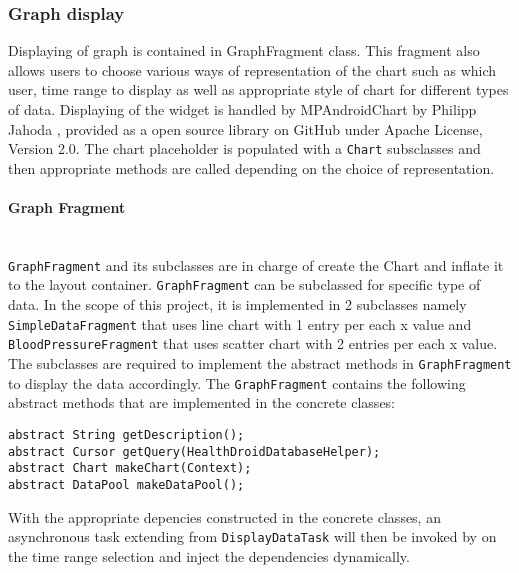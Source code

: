 \subsubsection{Graph display}
Displaying of graph is contained in GraphFragment class. This fragment also allows users to choose various ways of
representation of the chart such as which user, time range to display as well as appropriate style of chart for
different types of data. Displaying of the widget is handled by MPAndroidChart by Philipp Jahoda \cite{MPAndroidChart},
provided as a open source library on GitHub under Apache License, Version 2.0. The chart placeholder is populated with a
\texttt{Chart} subsclasses and then appropriate methods are called depending on the choice of representation.

\paragraph{Graph Fragment}\mbox{} \\
\texttt{GraphFragment} and its subclasses are in charge of create the Chart and inflate it to the layout container.
\texttt{GraphFragment} can be subclassed for specific type of data. In the scope of this project, it is implemented in 2
subclasses namely \texttt{SimpleDataFragment} that uses line chart with 1 entry per each x value and
\texttt{BloodPressureFragment} that uses scatter chart with 2 entries per each x value. The subclasses are required to
implement the abstract methods in \texttt{GraphFragment} to display the data accordingly.  The \texttt{GraphFragment}
contains the following abstract methods that are implemented in the concrete classes:

\begin{lstlisting}
abstract String getDescription();
abstract Cursor getQuery(HealthDroidDatabaseHelper);
abstract Chart makeChart(Context);
abstract DataPool makeDataPool();
\end{lstlisting}

With the appropriate depencies constructed in the concrete classes, an asynchronous task extending from
\texttt{DisplayDataTask} will then be invoked by on the time range selection and inject the dependencies dynamically.

